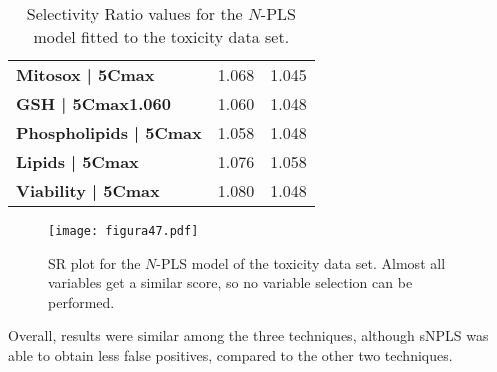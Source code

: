 \begin{table}[hbtp]
{\begin{tabular}{lcc}
\textbf{Mitosox | 5Cmax}         & 1.068                & 1.045                \\
\textbf{GSH | 5Cmax1.060}        & 1.060                & 1.048                \\
\textbf{Phospholipids | 5Cmax}   & 1.058                & 1.048                \\
\textbf{Lipids | 5Cmax}          & 1.076                & 1.058                \\
\textbf{Viability | 5Cmax}       & 1.080                & 1.048                \\ \hline
\end{tabular}}
\caption{Selectivity Ratio values for the $N$-PLS model fitted to the toxicity data set.}
\label{table:SR_toxi}
\end{table}


\begin{figure}[hbtp]
	\centering
\texttt{[image: figura47.pdf]}
\caption[SR plot for the $N$-PLS model of the toxicity data set]{SR plot for the $N$-PLS model of the toxicity data set. Almost all variables get a similar score, so no variable selection can be performed.}
\label{figura47}
\end{figure}

Overall, results were similar among the three techniques, although sNPLS was able to obtain less false positives, compared to the other two techniques.